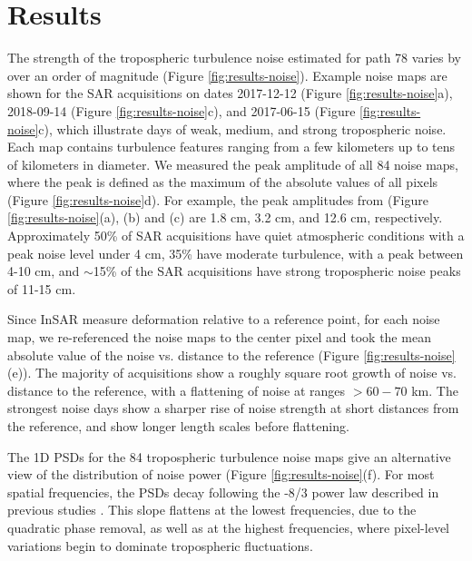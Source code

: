 \documentclass{utexasthesis}
\begin{document}
\section{Results}
\label{sec:results}

The strength of the tropospheric turbulence noise estimated for path 78 varies by over an order of magnitude (Figure \ref{fig:results-noise}). Example noise maps are shown for the SAR acquisitions on dates 2017-12-12 (Figure \ref{fig:results-noise}a), 2018-09-14 (Figure \ref{fig:results-noise}c), and 2017-06-15 (Figure \ref{fig:results-noise}c), which illustrate days of weak, medium, and strong tropospheric noise. Each map contains turbulence features ranging from a few kilometers up to tens of kilometers in diameter.  
We measured the peak amplitude of all 84 noise maps, where the peak is defined as the maximum of the absolute values of all pixels (Figure \ref{fig:results-noise}d). 
For example, the peak amplitudes from (Figure \ref{fig:results-noise}(a), (b) and (c) are 1.8 cm, 3.2 cm, and 12.6 cm, respectively.  Approximately 50\% of SAR acquisitions have quiet atmospheric conditions with a peak noise level under 4 cm, 35\% have moderate turbulence, with a peak between 4-10 cm, and $\sim$15\% of the SAR acquisitions have strong tropospheric noise peaks of 11-15 cm. 

Since InSAR measure deformation relative to a reference point, for each noise map, we re-referenced the noise maps to the center pixel and took the mean absolute value of the noise vs. distance to the reference (Figure \ref{fig:results-noise}(e)). The majority of acquisitions show a roughly square root growth of noise vs. distance to the reference, with a flattening of noise at ranges $>60-70$ km. The strongest noise days show a sharper rise of noise strength at short distances from the reference, and show longer length scales before flattening.


The 1D PSDs for the 84 tropospheric turbulence noise maps give an alternative view of the distribution of noise power (Figure \ref{fig:results-noise}(f). For most spatial frequencies, the PSDs decay following the -8/3 power law described in previous studies \cite{Hanssen2001RadarInterferometryData, Onn2006ModelingWaterVapor}. This slope flattens at the lowest frequencies, due to the quadratic phase removal, as well as at the highest frequencies, where pixel-level variations begin to dominate tropospheric fluctuations.
\end{document}

